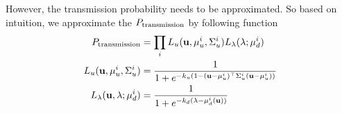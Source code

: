 \documentclass[10pt,twocolumn,letterpaper]{article}
\DeclareMathOperator{\sech}{sech}
\begin{document}
However, the transmission probability needs to be approximated.  
%
% 
% 
% 
% 
% 
% 
So based on intuition, we approximate the $P_{\text{transmission}}$ by following function
\begin{align}
\label{eq:evalCumulativePtrans}
  P_{\text{transmission}} &= \prod_i L_u(\mathbf{u}, \mu^i_u,\Sigma^i_u)L_{\lambda}(\lambda; \mu^i_d)\\
  L_u(\mathbf{u}, \mu^i_u,\Sigma^i_u) &= \frac{1}{
    1 + e^{-k_u(1 - (\mathbf{u} - \mu^i_u)^\top\Sigma^i_u(\mathbf{u} -
    \mu^i_u))}
  }
  \\
  L_{\lambda}(\mathbf{u}, \lambda; \mu^i_d) &= \frac{1}{
  1 + e^{-k_d(\lambda - \mu^i_d(\mathbf{u}))}
}
\end{align}
\end{document}
